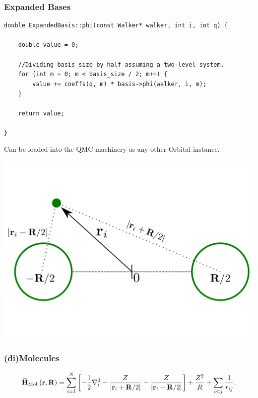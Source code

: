 \documentclass{beamer}
\newcommand{\OP}[1]{{\bf\widehat{#1}}}
\begin{document}
\begin{frame}[containsverbatim]\frametitle{Expanded Bases}
\scriptsize
\begin{verbatim}
double ExpandedBasis::phi(const Walker* walker, int i, int q) {

    double value = 0;

    //Dividing basis_size by half assuming a two-level system.
    for (int m = 0; m < basis_size / 2; m++) {
        value += coeffs(q, m) * basis->phi(walker, i, m);
    }

    return value;

}
\end{verbatim}
\normalsize

Can be loaded into the QMC machinery as any other Orbital instance.
\end{frame}




\begin{frame}
\begin{center}
 \includegraphics[scale=0.35]{Molecules.pdf}
\end{center}
\end{frame}



\begin{frame}\frametitle{(di)Molecules}
 \begin{equation*}
 \OP{H}_{\mathrm{Mol.}}(\mathbf{r}, \mathbf{R}) = \sum_{i=1}^N \left[-\frac{1}{2}\nabla_i^2 - \frac{Z}{|\mathbf{r}_i + \mathbf{R}/2|} - \frac{Z}{|\mathbf{r}_i - \mathbf{R}/2|}\right] + \frac{Z^2}{R} + \sum_{i<j} \frac{1}{r_{ij}}.
\end{equation*}
\end{frame}
\end{document}
